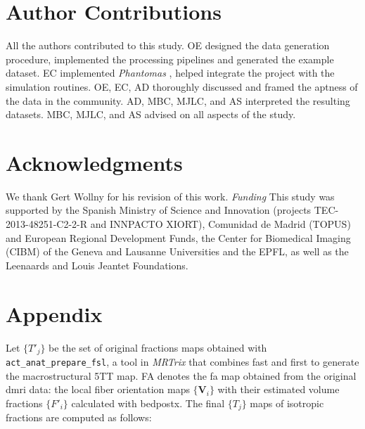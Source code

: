 \documentclass[english]{frontiers/frontiersSCNS} %
\begin{document}
\section*{Author Contributions}
All the authors contributed to this study.
OE designed the data generation procedure, implemented the processing pipelines and generated the example dataset.
EC implemented \emph{Phantomas} \citep{caruyer_phantomas_2014}, helped integrate the project with the simulation routines.
OE, EC, AD thoroughly discussed and framed the aptness of the data in the community.
AD, MBC, MJLC, and AS interpreted the resulting datasets.
MBC, MJLC, and AS advised on all aspects of the study.


\section*{Acknowledgments}
We thank Gert Wollny for his revision of this work.
\textit{Funding\textcolon}
This study was supported by the Spanish Ministry of Science and Innovation
  (projects TEC-2013-48251-C2-2-R and INNPACTO XIORT), Comunidad de Madrid (TOPUS) and
  European Regional Development Funds, the Center for Biomedical Imaging
  (CIBM) of the Geneva and Lausanne Universities and the EPFL, as well as the
  Leenaards and Louis Jeantet Foundations.

\nolinenumbers




\glsresetall
\linenumbers
\section*{Appendix}\label{sec:appendix}
Let $\{T'_j\}$ be the set of original fractions maps obtained with \texttt{act\_anat\_prepare\_fsl}, a
  tool in \emph{MRTrix} that combines \gls*{fast} and \gls*{first}
  to generate the macrostructural 5TT map.
FA denotes the \gls*{fa} map obtained from the original \gls*{dmri} data: the local fiber orientation maps
  $\{\mathbf{V}_i\}$ with their estimated volume fractions $\{F'_i\}$ calculated with \gls*{bedpostx}.
The final $\{T_j\}$ maps of isotropic fractions are computed as follows:
\end{document}
